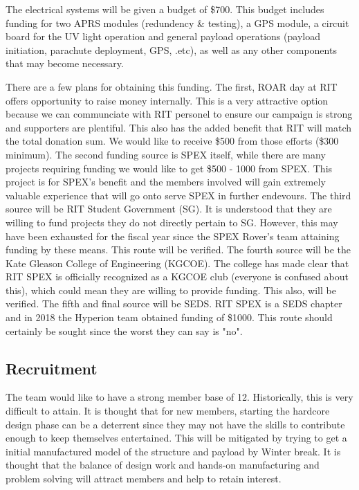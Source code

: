 \documentclass[conference]{IEEEtran} %
\begin{document}
The electrical systems will be given a budget of \$700. This budget includes funding for two APRS modules (redundency \& testing), a GPS module, a circuit board for the UV light operation and 
general payload operations (payload initiation, parachute deployment, GPS, .etc), as well as any other components that may become necessary. 

There are a few plans for obtaining this funding. The first, ROAR day at RIT offers opportunity to raise money internally. This is a very attractive option because we can communciate with RIT 
personel to ensure our campaign is strong and supporters are plentiful. This also has the added benefit that RIT will match the total donation sum. We would like to receive \$500 from those 
efforts (\$300 minimum). The second funding source is SPEX itself, while there are many projects requiring funding we would like to get \$500 - 1000 from SPEX. This project is for SPEX's 
benefit and the members involved will gain extremely valuable experience that will go onto serve SPEX in further endevours. The third source will be RIT Student Government (SG). It is understood that 
they are willing to fund projects they do not directly pertain to SG. However, this may have been exhausted for the fiscal year since the SPEX Rover's team attaining funding by these means. This 
route will be verified. The fourth source will be the Kate Gleason College of Engineering (KGCOE). The college has made clear that RIT SPEX is officially recognized as a KGCOE club (everyone 
is confused about this), which could mean they are willing to provide funding. This also, will be verified. The fifth and final source will be SEDS. RIT SPEX is a SEDS chapter and in 2018 the Hyperion 
team obtained funding of \$1000. This route should certainly be sought since the worst they can say is "no". 

\subsection{Recruitment}
\label{subsec:recruiting}
The team would like to have a strong member base of 12. Historically, this is very difficult to attain. It is thought that for new members, starting the hardcore design phase can be a 
deterrent since they may not have the skills to contribute enough to keep themselves entertained. This will be mitigated by trying to get a initial manufactured model of the structure and payload 
by Winter break. It is thought that the balance of design work and hands-on manufacturing and problem solving will attract members and help to retain interest. 
\end{document}
